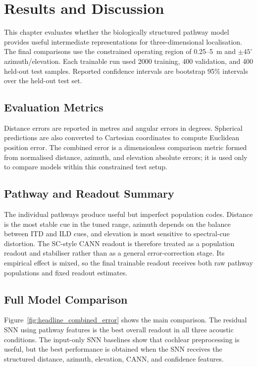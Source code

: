 \chapter{Results and Discussion} \label{ch:results}

This chapter evaluates whether the biologically structured pathway model provides useful intermediate representations for three-dimensional localisation. The final comparisons use the constrained operating region of 0.25--5~m and $\pm45^\circ$ azimuth/elevation. Each trainable run used 2000 training, 400 validation, and 400 held-out test samples. Reported confidence intervals are bootstrap 95\% intervals over the held-out test set.

\section{Evaluation Metrics}

Distance errors are reported in metres and angular errors in degrees. Spherical predictions are also converted to Cartesian coordinates to compute Euclidean position error. The combined error is a dimensionless comparison metric formed from normalised distance, azimuth, and elevation absolute errors; it is used only to compare models within this constrained test setup.

\section{Pathway and Readout Summary}

The individual pathways produce useful but imperfect population codes. Distance is the most stable cue in the tuned range, azimuth depends on the balance between ITD and ILD cues, and elevation is most sensitive to spectral-cue distortion. The SC-style CANN readout is therefore treated as a population readout and stabiliser rather than as a general error-correction stage. Its empirical effect is mixed, so the final trainable readout receives both raw pathway populations and fixed readout estimates.

\section{Full Model Comparison}

Figure~\ref{fig:headline_combined_error} shows the main comparison. The residual SNN using pathway features is the best overall readout in all three acoustic conditions. The input-only SNN baselines show that cochlear preprocessing is useful, but the best performance is obtained when the SNN receives the structured distance, azimuth, elevation, CANN, and confidence features.

